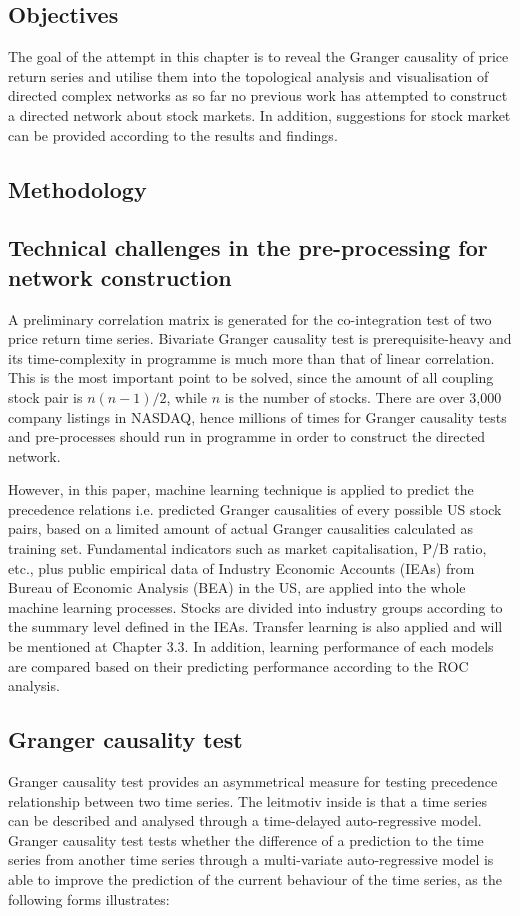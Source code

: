 \subsection{Objectives}
The goal of the attempt in this chapter is to reveal the Granger causality of price return series and utilise them into the topological analysis and visualisation of directed complex networks as so far no previous work has attempted to construct a directed network about stock markets. In addition, suggestions for stock market can be provided according to the results and findings.

\subsection{Methodology}
\subsection{Technical challenges in the pre-processing for network construction}
A preliminary correlation matrix is generated for the co-integration test of two price return time series. Bivariate Granger causality test is prerequisite-heavy and its time-complexity in programme is much more than that of linear correlation. This is the most important point to be solved, since the amount of all coupling stock pair is $n(n-1)/2$, while $n$ is the number of stocks. There are over 3,000 company listings in NASDAQ, hence millions of times for Granger causality tests and pre-processes should run in programme in order to construct the directed network.

However, in this paper, machine learning technique is applied to predict the precedence relations i.e. predicted Granger causalities of every possible US stock pairs, based on a limited amount of actual Granger causalities calculated as training set. Fundamental indicators such as market capitalisation, P/B ratio, etc., plus public empirical data of Industry Economic Accounts (IEAs) from Bureau of Economic Analysis (BEA) \cite{bea} in the US, are applied into the whole machine learning processes. Stocks are divided into industry groups according to the summary level defined in the IEAs. Transfer learning is also applied and will be mentioned at Chapter 3.3.  In addition, learning performance of each models are compared based on their predicting performance according to the ROC analysis.

\subsection{Granger causality test}
Granger causality test \cite{granger1969investigating} provides an asymmetrical measure for testing precedence relationship between two time series. The leitmotiv inside is that a time series can be described and analysed through a time-delayed auto-regressive model. Granger causality test tests whether the difference of a prediction to the time series from another time series through a multi-variate auto-regressive model is able to improve the prediction of the current behaviour of the time series, as the following forms illustrates:

